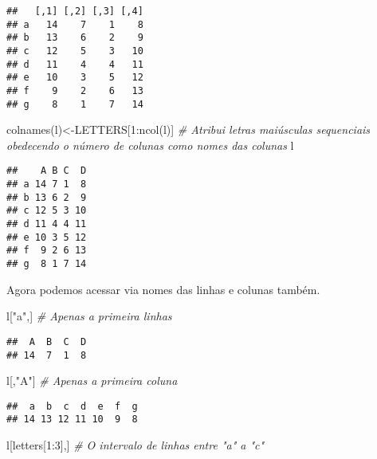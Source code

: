 \documentclass[
]{book}
\newenvironment{Shaded}{\begin{snugshade}}{\end{snugshade}}
\newcommand{\CommentTok}[1]{\textcolor[rgb]{0.56,0.35,0.01}{\textit{#1}}}
\newcommand{\DecValTok}[1]{\textcolor[rgb]{0.00,0.00,0.81}{#1}}
\newcommand{\FunctionTok}[1]{\textcolor[rgb]{0.00,0.00,0.00}{#1}}
\newcommand{\NormalTok}[1]{#1}
\newcommand{\OtherTok}[1]{\textcolor[rgb]{0.56,0.35,0.01}{#1}}
\newcommand{\SpecialCharTok}[1]{\textcolor[rgb]{0.00,0.00,0.00}{#1}}
\newcommand{\StringTok}[1]{\textcolor[rgb]{0.31,0.60,0.02}{#1}}
\begin{document}
\begin{verbatim}
##   [,1] [,2] [,3] [,4]
## a   14    7    1    8
## b   13    6    2    9
## c   12    5    3   10
## d   11    4    4   11
## e   10    3    5   12
## f    9    2    6   13
## g    8    1    7   14
\end{verbatim}

\begin{Shaded}
\begin{Highlighting}[]
\FunctionTok{colnames}\NormalTok{(l)}\OtherTok{\textless{}{-}}\NormalTok{LETTERS[}\DecValTok{1}\SpecialCharTok{:}\FunctionTok{ncol}\NormalTok{(l)] }\CommentTok{\# Atribui letras maiúsculas sequenciais obedecendo o número de colunas como nomes das colunas}
\NormalTok{l}
\end{Highlighting}
\end{Shaded}

\begin{verbatim}
##    A B C  D
## a 14 7 1  8
## b 13 6 2  9
## c 12 5 3 10
## d 11 4 4 11
## e 10 3 5 12
## f  9 2 6 13
## g  8 1 7 14
\end{verbatim}

Agora podemos acessar via nomes das linhas e colunas também.

\begin{Shaded}
\begin{Highlighting}[]
\NormalTok{l[}\StringTok{"a"}\NormalTok{,] }\CommentTok{\# Apenas a primeira linhas}
\end{Highlighting}
\end{Shaded}

\begin{verbatim}
##  A  B  C  D 
## 14  7  1  8
\end{verbatim}

\begin{Shaded}
\begin{Highlighting}[]
\NormalTok{l[,}\StringTok{"A"}\NormalTok{] }\CommentTok{\# Apenas a primeira coluna}
\end{Highlighting}
\end{Shaded}

\begin{verbatim}
##  a  b  c  d  e  f  g 
## 14 13 12 11 10  9  8
\end{verbatim}

\begin{Shaded}
\begin{Highlighting}[]
\NormalTok{l[letters[}\DecValTok{1}\SpecialCharTok{:}\DecValTok{3}\NormalTok{],] }\CommentTok{\# O intervalo de linhas entre "a" a "c"}
\end{Highlighting}
\end{Shaded}
\end{document}
